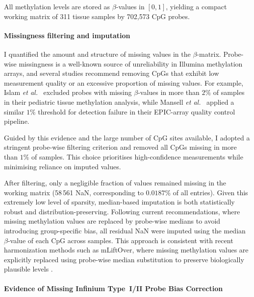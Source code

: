 \documentclass[10pt]{extarticle}
\begin{document}
All methylation levels are stored as $\beta$-values in $[0,1]$, 
yielding a compact working matrix of 311 tissue samples by 702{,}573 CpG probes.
\paragraph{Missingness filtering and imputation}
\label{par:gse287331_missingness}
I quantified the amount and structure of
missing values in the $\beta$-matrix. Probe-wise missingness is a well-known
source of unreliability in Illumina methylation arrays, and several studies recommend
removing CpGs that exhibit low measurement quality or an excessive proportion of missing
values. For example, Islam \textit{et al.}~\cite{islam2019_pediatric_dnamm} excluded probes
with missing $\beta$-values in more than $2\%$ of samples in their pediatric tissue
methylation analysis, while Mansell \textit{et al.}~\cite{mansell2019guidance} applied a
similar $1\%$ threshold for detection failure in their EPIC-array quality control
pipeline. 

Guided by this evidence and the large number of CpG sites available,
I adopted a stringent probe-wise filtering criterion and removed all
CpGs missing in more than $1\%$ of samples. This choice prioritises high-confidence
measurements while minimising reliance on imputed values.

After filtering, only a negligible fraction of values remained missing in the working
matrix (58\,561 NaN, corresponding to $0.0187\%$ of all entries). Given this extremely low
level of sparsity, median-based imputation is both statistically robust and
distribution-preserving. Following current recommendations, where missing methylation values
are replaced by probe-wise medians to avoid introducing group-specific bias, all residual
NaN were imputed using the median $\beta$-value of each CpG across samples. This approach is consistent with recent harmonization methods such as mLiftOver, 
where missing methylation values are explicitly replaced using probe-wise median 
substitution to preserve biologically plausible levels \cite{chen2024_mliftover}.


\paragraph{Evidence of Missing Infinium Type~I/II Probe Bias Correction}
\end{document}
